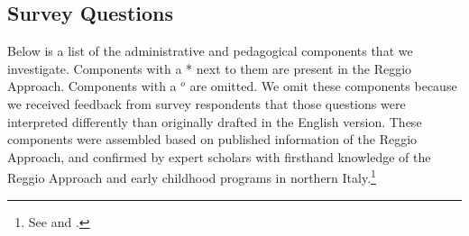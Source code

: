 
\subsection{Survey Questions}
Below is a list of the administrative and pedagogical components that we investigate. Components with a * next to them are present in the Reggio Approach. Components with a $^o$ are omitted. We omit these components because we received feedback from survey respondents that those questions were interpreted differently than originally drafted in the English version. These components were assembled based on published information of the Reggio Approach, and confirmed by expert scholars with firsthand knowledge of the Reggio Approach and early childhood programs in northern Italy.\footnote{See \citet{Edwards-etal-eds_1998_Hundred-Languages} and \citet{Corsaro_2008_Policy-Practice}.}

